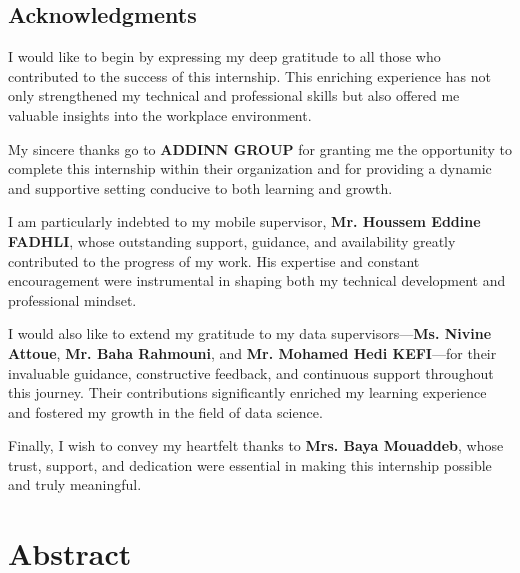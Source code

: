 \documentclass[12pt,a4paper]{report}
\begin{document}
\begin{titlepage}
    

  
    \thispagestyle{empty}
\end{titlepage}

\setcounter{page}{1}

\tableofcontents
\newpage
\listoffigures
\newpage

\begin{center}
\section*{Acknowledgments}
\end{center}

I would like to begin by expressing my deep gratitude to all those who contributed to the success of this internship. This enriching experience has not only strengthened my technical and professional skills but also offered me valuable insights into the workplace environment.

My sincere thanks go to \textbf{ADDINN GROUP} for granting me the opportunity to complete this internship within their organization and for providing a dynamic and supportive setting conducive to both learning and growth.

I am particularly indebted to my mobile supervisor, \textbf{Mr. Houssem Eddine FADHLI}, whose outstanding support, guidance, and availability greatly contributed to the progress of my work. His expertise and constant encouragement were instrumental in shaping both my technical development and professional mindset.

I would also like to extend my gratitude to my data supervisors—\textbf{Ms. Nivine Attoue}, \textbf{Mr. Baha Rahmouni}, and \textbf{Mr. Mohamed Hedi KEFI}—for their invaluable guidance, constructive feedback, and continuous support throughout this journey. Their contributions significantly enriched my learning experience and fostered my growth in the field of data science.

Finally, I wish to convey my heartfelt thanks to \textbf{Mrs. Baya Mouaddeb}, whose trust, support, and dedication were essential in making this internship possible and truly meaningful.

\newpage

\chapter*{Abstract}
\end{document}
